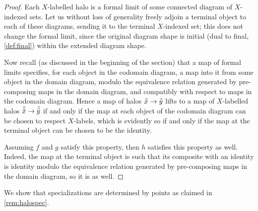 \documentclass[11pt, oneside, article]{memoir}
\theoremstyle{plain}
\theoremstyle{definition}
\theoremstyle{remark}
\newcommand{\halo}[1]{\accentset{\circ}{#1}}
\newcommand{\lhalo}[1]{\accentset{\overline{\circ}}{#1}}
\newcommand{\xX}{X}
\begin{document}
\begin{proof}
  Each $\xX$-labelled halo is a formal limit of some connected diagram
  of $\xX$-indexed sets. Let us without loss of generality freely
  adjoin a terminal object to each of these diagrams, sending it to
  the terminal $\xX$-indexed set; this does not change the formal
  limit, since the original diagram shape is initial (dual to final,
  \cref{def:final}) within the extended diagram shape.

  Now recall (as discussed in the beginning of the section) that a map
  of formal limits specifies, for each object in the codomain diagram,
  a map into it from some object in the domain diagram, modulo the
  equivalence relation generated by pre-composing maps in the domain
  diagram, and compatibly with respect to maps in the codomain
  diagram. Hence a map of halos $\halo{x} \to \halo{y}$ lifts to a map
  of $\xX$-labelled halos $\lhalo{x} \to \lhalo{y}$ if and only if the
  map at each object of the codomain diagram can be chosen to respect
  $\xX$-labels, which is evidently so if and only if the map at the
  terminal object can be chosen to be the identity.

  Assuming $f$ and $g$ satisfy this property, then $h$ satisfies this
  property as well. Indeed, the map at the terminal object is such
  that its composite with an identity is identity modulo the
  equivalence relation generated by pre-composing maps in the domain
  diagram, so it is as well.
\end{proof}

We show that specializations are determined by points as claimed in
\cref{rem:halospec}.
\end{document}
